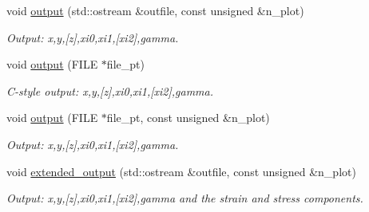 \begin{DoxyCompactItemize}
void \hyperlink{classoomph_1_1PVDEquations_a5e3a09d059ced1ee9f9e1a7923171ab7}{output} (std\+::ostream \&outfile, const unsigned \&n\+\_\+plot)
\begin{DoxyCompactList}\small\item\em Output\+: x,y,\mbox{[}z\mbox{]},xi0,xi1,\mbox{[}xi2\mbox{]},gamma. \end{DoxyCompactList}\item 
void \hyperlink{classoomph_1_1PVDEquations_ae5cf4a0254fbb7db5d255db69cfb810e}{output} (F\+I\+LE $\ast$file\+\_\+pt)
\begin{DoxyCompactList}\small\item\em C-\/style output\+: x,y,\mbox{[}z\mbox{]},xi0,xi1,\mbox{[}xi2\mbox{]},gamma. \end{DoxyCompactList}\item 
void \hyperlink{classoomph_1_1PVDEquations_ac35042c495411ffc96501d6705b8fa7a}{output} (F\+I\+LE $\ast$file\+\_\+pt, const unsigned \&n\+\_\+plot)
\begin{DoxyCompactList}\small\item\em Output\+: x,y,\mbox{[}z\mbox{]},xi0,xi1,\mbox{[}xi2\mbox{]},gamma. \end{DoxyCompactList}\item 
void \hyperlink{classoomph_1_1PVDEquations_a60ed017dce1a6a98098b8ad3127389c9}{extended\+\_\+output} (std\+::ostream \&outfile, const unsigned \&n\+\_\+plot)
\begin{DoxyCompactList}\small\item\em Output\+: x,y,\mbox{[}z\mbox{]},xi0,xi1,\mbox{[}xi2\mbox{]},gamma and the strain and stress components. \end{DoxyCompactList}\end{DoxyCompactItemize}

